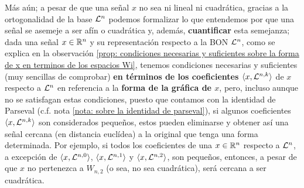 Más aún; a pesar de que
una señal $x$ no sea ni lineal ni cuadrática, gracias a la 
ortogonalidad de la base
$\mathcal{L}^{n}$ podemos formalizar lo que
entendemos por que una señal se asemeje a ser
afín o cuadrática y, además, \textbf{cuantificar} esta semejanza;
dada una señal $x \in \mathbb{R}^{n}$ y
su representación respecto a la BON $\mathcal{L}^{n}$,
como se explica en la observación 
\ref{prop: condiciones necesarias y suficientes sobre la forma de x en terminos de los espacios Wi}, tenemos condiciones necesarias y suficientes
(muy sencillas de comprobar)
\textbf{en términos de los coeficientes $\langle x , \mathcal{L}^{n,k} \rangle$}
de $x$ respecto a $\mathcal{L}^{n}$ 
en referencia a la \textbf{forma
de la gráfica de $x$}, pero, incluso aunque no se satisfagan
estas condiciones,
puesto que contamos con la identidad de Parseval
(c.f. nota \ref{nota: sobre la identidad de parseval}),
si
algunos coeficientes $\langle x , \mathcal{L}^{n,k} \rangle$ son considerados pequeños, estos
pueden eliminarse y obtener así una señal cercana (en distancia
euclídea) a la original que tenga una forma determinada.
Por ejemplo, si todos los coeficientes de una 
$x \in \mathbb{R}^{n}$ respecto a $\mathcal{L}^{n}$, a excepción de 
$\langle x , \mathcal{L}^{n,0} \rangle$,
$\langle x , \mathcal{L}^{n,1} \rangle$ y
$\langle x , \mathcal{L}^{n,2} \rangle$,
son pequeños, entonces, a pesar de que
$x$ no pertenezca a $W_{n,2}$ (o sea, no sea cuadrática),
será cercana a ser cuadrática.

